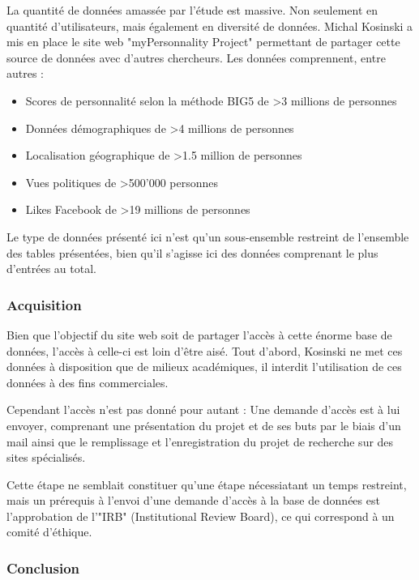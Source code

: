 			La quantité de données amassée par l'étude est massive. Non seulement en quantité d'utilisateurs, mais également en diversité de données. Michal Kosinski a mis en place le site web "myPersonnality Project"\cite{mypersonnality} permettant de partager cette source de données avec d'autres chercheurs. Les données comprennent, entre autres :

			\begin{itemize}
				\item Scores de personnalité selon la méthode BIG5 de >3 millions de personnes
				\item Données démographiques de >4 millions de personnes
				\item Localisation géographique de >1.5 million de personnes
				\item Vues politiques de >500'000 personnes
				\item Likes Facebook de >19 millions de personnes
			\end{itemize}

			Le type de données présenté ici n'est qu'un sous-ensemble restreint de l'ensemble des tables présentées, bien qu'il s'agisse ici des données comprenant le plus d'entrées au total.

		\subsubsection{Acquisition}

			Bien que l'objectif du site web soit de partager l'accès à cette énorme base de données, l'accès à celle-ci est loin d'être aisé. Tout d'abord, Kosinski ne met ces données à disposition que de milieux académiques, il interdit l'utilisation de ces données à des fins commerciales.

			Cependant l'accès n'est pas donné pour autant : Une demande d'accès est à lui envoyer, comprenant une présentation du projet et de ses buts par le biais d'un mail ainsi que le remplissage et l'enregistration du projet de recherche sur des sites spécialisés.

			Cette étape ne semblait constituer qu'une étape nécessiatant un temps restreint, mais un prérequis à l'envoi d'une demande d'accès à la base de données est l'approbation de l'"IRB" (Institutional Review Board), ce qui correspond à un comité d'éthique.

		\subsubsection{Conclusion}

